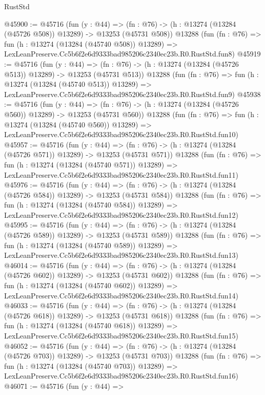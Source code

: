\begin{lexlean}{RustStd}
\begin{coremodule}
@45900 := @45716
    (fun (y : @44) =>
    (fn : @76) -> (h : @13274 (@13284 (@45726 @508)) @13289) -> @13253 (@45731 @508))
    @13288
    (fun (fn : @76) =>
    fun (h : @13274 (@13284 (@45740 @508)) @13289) =>
    LexLeanPreserve.Cc5b6f2e6d9333bad985206c2340ec23b.R0.RustStd.fun8)
@45919 := @45716
    (fun (y : @44) =>
    (fn : @76) -> (h : @13274 (@13284 (@45726 @513)) @13289) -> @13253 (@45731 @513))
    @13288
    (fun (fn : @76) =>
    fun (h : @13274 (@13284 (@45740 @513)) @13289) =>
    LexLeanPreserve.Cc5b6f2e6d9333bad985206c2340ec23b.R0.RustStd.fun9)
@45938 := @45716
    (fun (y : @44) =>
    (fn : @76) -> (h : @13274 (@13284 (@45726 @560)) @13289) -> @13253 (@45731 @560))
    @13288
    (fun (fn : @76) =>
    fun (h : @13274 (@13284 (@45740 @560)) @13289) =>
    LexLeanPreserve.Cc5b6f2e6d9333bad985206c2340ec23b.R0.RustStd.fun10)
@45957 := @45716
    (fun (y : @44) =>
    (fn : @76) -> (h : @13274 (@13284 (@45726 @571)) @13289) -> @13253 (@45731 @571))
    @13288
    (fun (fn : @76) =>
    fun (h : @13274 (@13284 (@45740 @571)) @13289) =>
    LexLeanPreserve.Cc5b6f2e6d9333bad985206c2340ec23b.R0.RustStd.fun11)
@45976 := @45716
    (fun (y : @44) =>
    (fn : @76) -> (h : @13274 (@13284 (@45726 @584)) @13289) -> @13253 (@45731 @584))
    @13288
    (fun (fn : @76) =>
    fun (h : @13274 (@13284 (@45740 @584)) @13289) =>
    LexLeanPreserve.Cc5b6f2e6d9333bad985206c2340ec23b.R0.RustStd.fun12)
@45995 := @45716
    (fun (y : @44) =>
    (fn : @76) -> (h : @13274 (@13284 (@45726 @589)) @13289) -> @13253 (@45731 @589))
    @13288
    (fun (fn : @76) =>
    fun (h : @13274 (@13284 (@45740 @589)) @13289) =>
    LexLeanPreserve.Cc5b6f2e6d9333bad985206c2340ec23b.R0.RustStd.fun13)
@46014 := @45716
    (fun (y : @44) =>
    (fn : @76) -> (h : @13274 (@13284 (@45726 @602)) @13289) -> @13253 (@45731 @602))
    @13288
    (fun (fn : @76) =>
    fun (h : @13274 (@13284 (@45740 @602)) @13289) =>
    LexLeanPreserve.Cc5b6f2e6d9333bad985206c2340ec23b.R0.RustStd.fun14)
@46033 := @45716
    (fun (y : @44) =>
    (fn : @76) -> (h : @13274 (@13284 (@45726 @618)) @13289) -> @13253 (@45731 @618))
    @13288
    (fun (fn : @76) =>
    fun (h : @13274 (@13284 (@45740 @618)) @13289) =>
    LexLeanPreserve.Cc5b6f2e6d9333bad985206c2340ec23b.R0.RustStd.fun15)
@46052 := @45716
    (fun (y : @44) =>
    (fn : @76) -> (h : @13274 (@13284 (@45726 @703)) @13289) -> @13253 (@45731 @703))
    @13288
    (fun (fn : @76) =>
    fun (h : @13274 (@13284 (@45740 @703)) @13289) =>
    LexLeanPreserve.Cc5b6f2e6d9333bad985206c2340ec23b.R0.RustStd.fun16)
@46071 := @45716
    (fun (y : @44) =>

\end{coremodule}
\end{lexlean}

